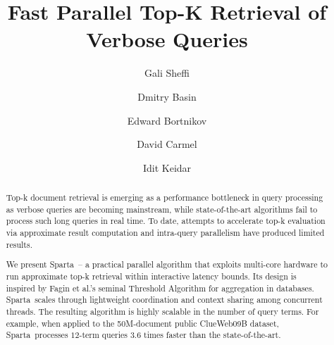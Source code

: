 \documentclass[sigconf]{acmart}
\begin{document}
\newcommand{\alg}{Sparta}  
\newcommand{\inred}[1]{{\color{red}{#1}}}
\newcommand{\inblue}[1]{{\color{blue}{#1}}}
\newcommand{\remove}[1]{}


\title{Fast Parallel Top-K Retrieval of Verbose Queries}


\author{Gali Sheffi}

\author{Dmitry Basin}

\author{Edward Bortnikov}

\author{David Carmel}

\author{Idit Keidar}





\begin{abstract}
Top-k document retrieval is emerging as a performance bottleneck in query processing as verbose queries are becoming 
mainstream, while state-of-the-art algorithms fail to process such long queries in real time. To date, attempts to
accelerate top-k evaluation 
via approximate result computation and intra-query parallelism have produced limited results. 

We present \alg\ -- a practical parallel algorithm that exploits multi-core hardware to run approximate top-k retrieval 
within interactive latency bounds. Its design is inspired by  Fagin et al.'s seminal Threshold Algorithm for  aggregation in databases. 
\alg\ scales through lightweight coordination and context sharing among concurrent threads. The resulting algorithm 
is highly scalable in the number of query terms. For example, when applied to the 50M-document public ClueWeb09B 
dataset, \alg\  processes $12$-term queries $3.6$ times faster than the state-of-the-art. 
\end{abstract}

\maketitle







%



  
\end{document}
